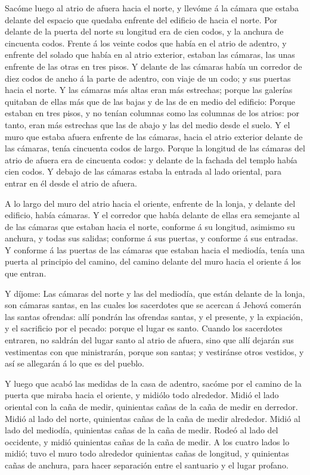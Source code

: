  Sacóme luego al atrio de afuera hacia el norte, y llevóme á
la cámara que estaba delante del espacio que quedaba enfrente del
edificio de hacia el norte.  Por delante de la puerta del
norte su longitud era de cien codos, y la anchura de cincuenta codos.
 Frente á los veinte codos que había en el atrio de adentro,
y enfrente del solado que había en al atrio exterior, estaban las
cámaras, las unas enfrente de las otras en tres pisos.  Y
delante de las cámaras había un corredor de diez codos de ancho á la
parte de adentro, con viaje de un codo; y sus puertas hacia el norte.
 Y las cámaras más altas eran más estrechas; porque las
galerías quitaban de ellas más que de las bajas y de las de en medio del
edificio:  Porque estaban en tres pisos, y no tenían
columnas como las columnas de los atrios: por tanto, eran más estrechas
que las de abajo y las del medio desde el suelo.  Y el muro
que estaba afuera enfrente de las cámaras, hacia el atrio exterior
delante de las cámaras, tenía cincuenta codos de largo. 
Porque la longitud de las cámaras del atrio de afuera era de cincuenta
codos: y delante de la fachada del templo había cien codos. 
Y debajo de las cámaras estaba la entrada al lado oriental, para entrar
en él desde el atrio de afuera.

 A lo largo del muro del atrio hacia el oriente, enfrente
de la lonja, y delante del edificio, había cámaras.  Y el
corredor que había delante de ellas era semejante al de las cámaras que
estaban hacia el norte, conforme á su longitud, asimismo su anchura, y
todas sus salidas; conforme á sus puertas, y conforme á sus entradas.
 Y conforme á las puertas de las cámaras que estaban hacia
el mediodía, tenía una puerta al principio del camino, del camino
delante del muro hacia el oriente á los que entran.

 Y díjome: Las cámaras del norte y las del mediodía, que
están delante de la lonja, son cámaras santas, en las cuales los
sacerdotes que se acercan á Jehová comerán las santas ofrendas: allí
pondrán las ofrendas santas, y el presente, y la expiación, y el
sacrificio por el pecado: porque el lugar es santo.  Cuando
los sacerdotes entraren, no saldrán del lugar santo al atrio de afuera,
sino que allí dejarán sus vestimentas con que ministrarán, porque son
santas; y vestiránse otros vestidos, y así se allegarán á lo que es del
pueblo.

 Y luego que acabó las medidas de la casa de adentro,
sacóme por el camino de la puerta que miraba hacia el oriente, y midiólo
todo alrededor.  Midió el lado oriental con la caña de
medir, quinientas cañas de la caña de medir en derredor. 
Midió al lado del norte, quinientas cañas de la caña de medir alrededor.
 Midió al lado del mediodía, quinientas cañas de la caña de
medir.  Rodeó al lado del occidente, y midió quinientas
cañas de la caña de medir.  A los cuatro lados lo midió;
tuvo el muro todo alrededor quinientas cañas de longitud, y quinientas
cañas de anchura, para hacer separación entre el santuario y el lugar
profano.

